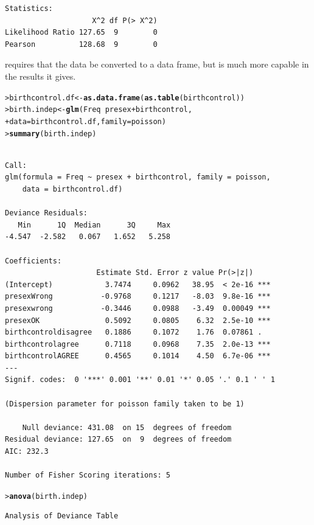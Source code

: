 \documentclass[10pt]{report}\usepackage[]{graphicx}\usepackage[]{color}
\makeatletter
\newcommand{\hlopt}[1]{\textcolor[rgb]{0,0,0}{#1}}%
\newcommand{\hlstd}[1]{\textcolor[rgb]{0.345,0.345,0.345}{#1}}%
\newcommand{\hlkwb}[1]{\textcolor[rgb]{0.69,0.353,0.396}{#1}}%
\newcommand{\hlkwc}[1]{\textcolor[rgb]{0.333,0.667,0.333}{#1}}%
\newcommand{\hlkwd}[1]{\textcolor[rgb]{0.737,0.353,0.396}{\textbf{#1}}}%
\newenvironment{kframe}{%
 \def\at@end@of@kframe{}%
 \ifinner\ifhmode%
  \def\at@end@of@kframe{\end{minipage}}%
  \begin{minipage}{\columnwidth}%
 \fi\fi%
 \def\FrameCommand##1{\hskip\@totalleftmargin \hskip-\fboxsep
 \colorbox{shadecolor}{##1}\hskip-\fboxsep
     \hskip-\linewidth \hskip-\@totalleftmargin \hskip\columnwidth}%
 \MakeFramed {\advance\hsize-\width
   \@totalleftmargin\z@ \linewidth\hsize
   \@setminipage}}%
 {\par\unskip\endMakeFramed%
 \at@end@of@kframe}
\newenvironment{knitrout}{}{} %
\renewenvironment{knitrout}{\small\renewcommand{\baselinestretch}{.85}}{} %
\makeatother
\begin{document}
\begin{Exercises}
\begin{enumerate*}
\begin{ans}
\begin{knitrout}
\begin{kframe}
\begin{verbatim}
Statistics:
                    X^2 df P(> X^2)
Likelihood Ratio 127.65  9        0
Pearson          128.68  9        0
\end{verbatim}
\end{kframe}
\end{knitrout}
     requires that the data
    be converted to a data frame, but is much more capable in the results it gives.
\begin{knitrout}\footnotesize
{}\color{fgcolor}\begin{kframe}
\begin{alltt}
\hlstd{> }\hlstd{birthcontrol.df} \hlkwb{<-} \hlkwd{as.data.frame}\hlstd{(}\hlkwd{as.table}\hlstd{(birthcontrol))}
\hlstd{> }\hlstd{birth.indep} \hlkwb{<-} \hlkwd{glm}\hlstd{(Freq} \hlopt{~} \hlstd{presex} \hlopt{+} \hlstd{birthcontrol,}
\hlstd{+ }                   \hlkwc{data} \hlstd{= birthcontrol.df,} \hlkwc{family} \hlstd{= poisson)}
\hlstd{> }\hlkwd{summary}\hlstd{(birth.indep)}
\end{alltt}
\begin{verbatim}

Call:
glm(formula = Freq ~ presex + birthcontrol, family = poisson, 
    data = birthcontrol.df)

Deviance Residuals: 
   Min      1Q  Median      3Q     Max  
-4.547  -2.582   0.067   1.652   5.258  

Coefficients:
                     Estimate Std. Error z value Pr(>|z|)    
(Intercept)            3.7474     0.0962   38.95  < 2e-16 ***
presexWrong           -0.9768     0.1217   -8.03  9.8e-16 ***
presexwrong           -0.3446     0.0988   -3.49  0.00049 ***
presexOK               0.5092     0.0805    6.32  2.5e-10 ***
birthcontroldisagree   0.1886     0.1072    1.76  0.07861 .  
birthcontrolagree      0.7118     0.0968    7.35  2.0e-13 ***
birthcontrolAGREE      0.4565     0.1014    4.50  6.7e-06 ***
---
Signif. codes:  0 '***' 0.001 '**' 0.01 '*' 0.05 '.' 0.1 ' ' 1

(Dispersion parameter for poisson family taken to be 1)

    Null deviance: 431.08  on 15  degrees of freedom
Residual deviance: 127.65  on  9  degrees of freedom
AIC: 232.3

Number of Fisher Scoring iterations: 5
\end{verbatim}
\begin{alltt}
\hlstd{> }\hlkwd{anova}\hlstd{(birth.indep)}
\end{alltt}
\begin{verbatim}
Analysis of Deviance Table


\end{verbatim}
\end{kframe}
\end{knitrout}
\end{ans}
\end{enumerate*}
\end{Exercises}
\end{document}
